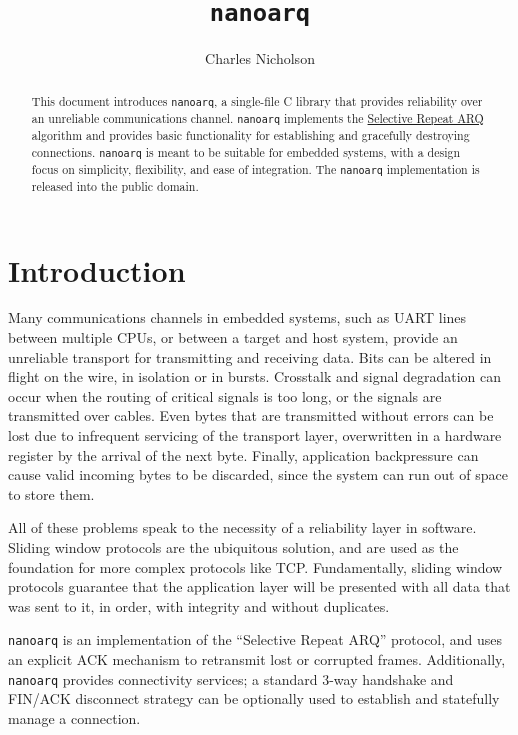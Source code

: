 \documentclass[11pt]{article}
\newcommand{\nanoarq}{\texttt{nanoarq}}
\begin{document}
\title{\nanoarq{}}
\author{Charles Nicholson}
\maketitle

\begin{abstract}
This document introduces \nanoarq{}, a single-file C library that provides reliability over an unreliable communications channel. \nanoarq{} implements the \href{https://en.wikipedia.org/wiki/Selective_Repeat_ARQ}{Selective Repeat ARQ}  algorithm and provides basic functionality for establishing and gracefully destroying connections. \nanoarq{} is meant to be suitable for embedded systems, with a design focus on simplicity, flexibility, and ease of integration. The \nanoarq{} implementation is released into the public domain.
\end{abstract}

\section{Introduction}
Many communications channels in embedded systems, such as UART lines between multiple CPUs, or between a target and host system, provide an unreliable transport for transmitting and receiving data. Bits can be altered in flight on the wire, in isolation or in bursts. Crosstalk and signal degradation can occur when the routing of critical signals is too long, or the signals are transmitted over cables. Even bytes that are transmitted without errors can be lost due to infrequent servicing of the transport layer, overwritten in a hardware register by the arrival of the next byte. Finally, application backpressure can cause valid incoming bytes to be discarded, since the system can run out of space to store them. \par
All of these problems speak to the necessity of a reliability layer in software. Sliding window protocols are the ubiquitous solution, and are used as the foundation for more complex protocols like TCP. Fundamentally, sliding window protocols guarantee that the application layer will be presented with all data that was sent to it, in order, with integrity and without duplicates. \par
\nanoarq{} is an implementation of the \enquote{Selective Repeat ARQ} protocol, and uses an explicit ACK mechanism to retransmit lost or corrupted frames. Additionally, \nanoarq{} provides connectivity services; a standard 3-way handshake and FIN/ACK disconnect strategy can be optionally used to establish and statefully manage a connection.
\end{document}
